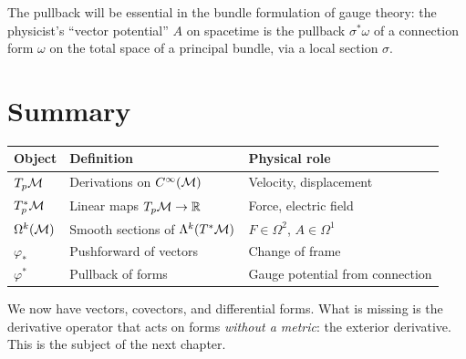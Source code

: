 The pullback will be essential in the bundle formulation of gauge theory: the physicist's ``vector potential'' $A$ on spacetime is the pullback $\sigma^*\omega$ of a connection form $\omega$ on the total space of a principal bundle, via a local section $\sigma$.

\section{Summary}

\begin{table}[h]
\centering
\renewcommand{\arraystretch}{1.4}
\begin{tabular}{lll}
\toprule
\textbf{Object} & \textbf{Definition} & \textbf{Physical role} \\
\midrule
$T_p\mathcal{M}$ & Derivations on $C^{\infty}(\mathcal{M})$ & Velocity, displacement \\
$T_p^*\mathcal{M}$ & Linear maps $T_p\mathcal{M} \to \mathbb{R}$ & Force, electric field \\
$\Omega^k(\mathcal{M})$ & Smooth sections of $\Lambda^k(T^*\mathcal{M})$ & $F \in \Omega^2$, $A \in \Omega^1$ \\
$\varphi_*$ & Pushforward of vectors & Change of frame \\
$\varphi^*$ & Pullback of forms & Gauge potential from connection \\
\bottomrule
\end{tabular}
\end{table}

We now have vectors, covectors, and differential forms. What is missing is the derivative operator that acts on forms \emph{without a metric}: the exterior derivative. This is the subject of the next chapter.
